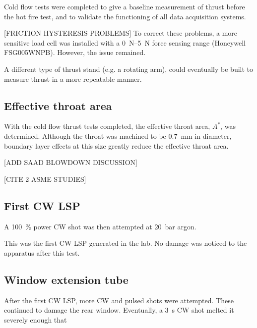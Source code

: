             Cold flow tests were completed to give a baseline measurement of thrust before the hot fire test, and to validate the functioning of all data acquisition systems.
            

            [FRICTION HYSTERESIS PROBLEMS] To correct these problems, a more sensitive load cell was installed with a \qtyrange{0}{5}{N} force sensing range (Honeywell FSG005WNPB). However, the issue remained.

            A different type of thrust stand (e.g. a rotating arm), could eventually be built to measure thrust in a more repeatable manner.
        
        \subsection{Effective throat area}
            
            With the cold flow thrust tests completed, the effective throat area, $A^*$, was determined. Although the throat was machined to be \qty{0.7}{mm} in diameter, boundary layer effects at this size greatly reduce the effective throat area.

            [ADD SAAD BLOWDOWN DISCUSSION]

            [CITE 2 ASME STUDIES]


        \subsection{First CW LSP}
            
            A \qty{100}{\%} power CW shot was then attempted at \qty{20}{bar} argon. 


            This was the first CW LSP generated in the lab. No damage was noticed to the apparatus after this test.

        \subsection{Window extension tube}
            
            After the first CW LSP, more CW and pulsed shots were attempted. These continued to damage the rear window. Eventually, a \qty{3}{s} CW shot melted it severely enough that 

